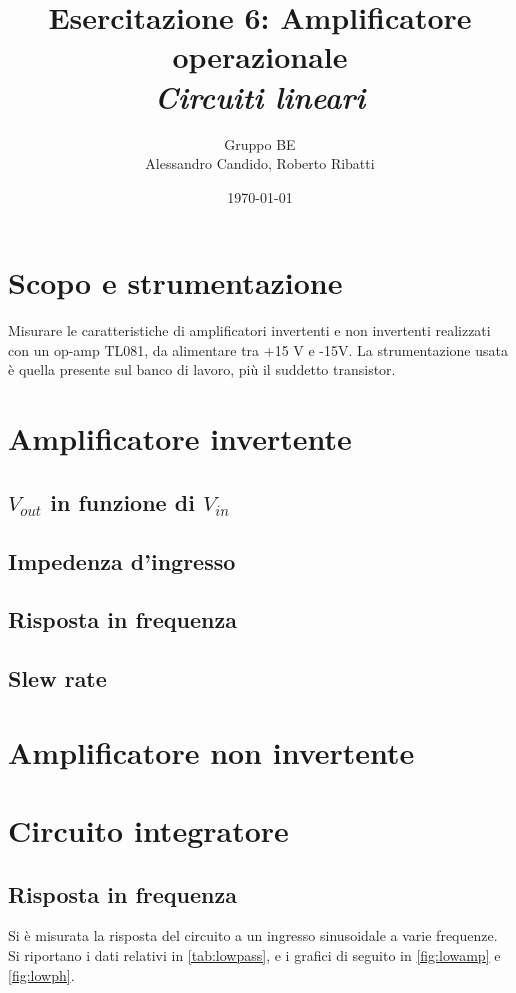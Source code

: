 \documentclass[10pt,a4paper]{article}
\title{Esercitazione 6: Amplificatore operazionale\\ \Large{\emph{Circuiti lineari}}}
\author{Gruppo BE \\ Alessandro Candido, Roberto Ribatti}
\date{\today}
\begin{document}
\maketitle

\section{Scopo e strumentazione}
Misurare le caratteristiche di amplificatori invertenti e non invertenti realizzati con un op-amp TL081, da alimentare tra +15 V e -15V.
La strumentazione usata è quella presente sul banco di lavoro, più il suddetto transistor.

\section{Amplificatore invertente}

\subsection{$V_{out}$ in funzione di $V_{in}$}

\subsection{Impedenza d'ingresso}

\subsection{Risposta in frequenza}

\subsection{Slew rate}

\section{Amplificatore non invertente}

\section{Circuito integratore}

\subsection{Risposta in frequenza}
Si è misurata la risposta del circuito a un ingresso sinusoidale a varie frequenze. Si riportano i dati relativi in \tablename{\ref{tab:lowpass}}, e i grafici di seguito in \figurename{\ref{fig:lowamp}} e \figurename{\ref{fig:lowph}}.
\end{document}
